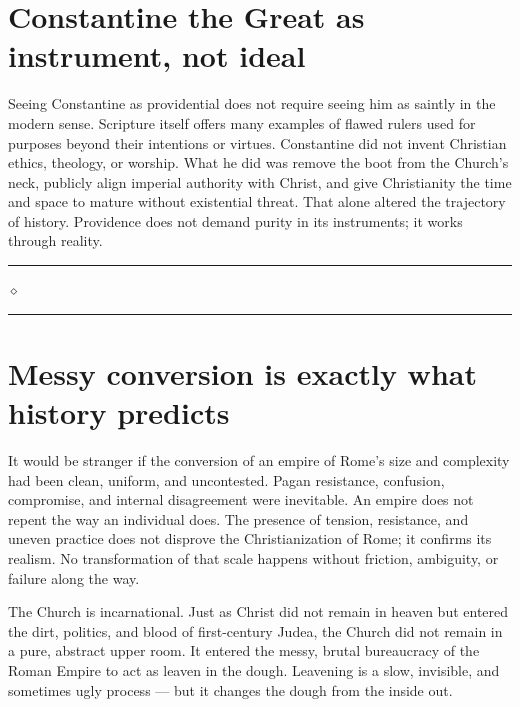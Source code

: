 \documentclass[10pt,twoside,openany]{book}
\newcommand{\ornrule}{%
  \par\bigskip
  {\noindent\hfil{\color{gold}\rule[0.5ex]{1.5in}{0.5pt}%
  \quad$\diamond$\quad%
  \rule[0.5ex]{1.5in}{0.5pt}}\hfil\par}%
  \bigskip
}
\begin{document}

\section{Constantine the Great as instrument, not ideal}

Seeing Constantine as providential does not require seeing him as
saintly in the modern sense. Scripture itself offers many examples of
flawed rulers used for purposes beyond their intentions or virtues.
Constantine did not invent Christian ethics, theology, or worship. What
he did was remove the boot from the Church's neck, publicly align
imperial authority with Christ, and give Christianity the time and
space to mature without existential threat. That alone altered the
trajectory of history. Providence does not demand purity in its
instruments; it works through reality.

\ornrule



\section{Messy conversion is exactly what history predicts}

It would be stranger if the conversion of an empire of Rome's size and
complexity had been clean, uniform, and uncontested. Pagan resistance,
confusion, compromise, and internal disagreement were inevitable. An
empire does not repent the way an individual does. The presence of
tension, resistance, and uneven practice does not disprove the
Christianization of Rome; it confirms its realism. No transformation
of that scale happens without friction, ambiguity, or failure along
the way.

The Church is incarnational. Just as Christ did not remain in heaven
but entered the dirt, politics, and blood of first-century Judea, the
Church did not remain in a pure, abstract upper room. It entered the
messy, brutal bureaucracy of the Roman Empire to act as leaven in the
dough. Leavening is a slow, invisible, and sometimes ugly process ---
but it changes the dough from the inside out.
\end{document}
